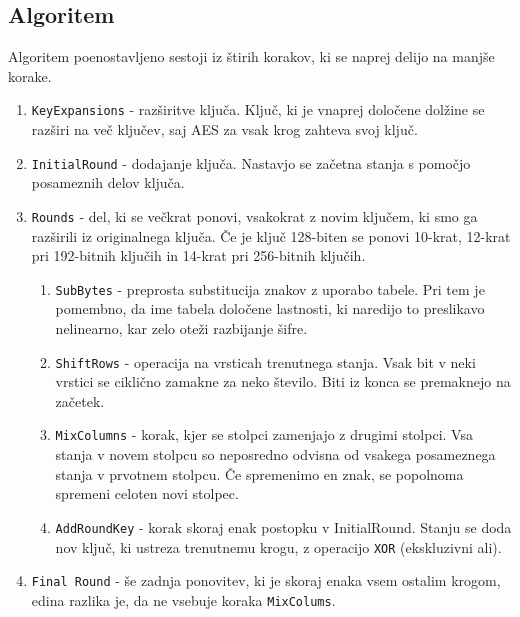 \subsection{Algoritem}
    Algoritem poenostavljeno sestoji iz štirih korakov, ki se naprej delijo na manjše korake.
    \begin{enumerate}
        \item \texttt{KeyExpansions} - razširitve ključa. Ključ, ki je vnaprej določene dolžine se razširi na več ključev, saj AES za vsak krog zahteva svoj ključ.
        \item \texttt{InitialRound} - dodajanje ključa. Nastavjo se začetna stanja s pomočjo posameznih delov ključa.
        \item \texttt{Rounds} - del, ki se večkrat ponovi, vsakokrat z novim ključem, ki smo ga razširili iz originalnega ključa. Če je ključ 128-biten se ponovi 10-krat, 12-krat pri 192-bitnih ključih in 14-krat pri 256-bitnih ključih.
            \begin{enumerate}
                \item \texttt{SubBytes} - preprosta substitucija znakov z uporabo tabele. Pri tem je pomembno, da ime tabela določene lastnosti, ki naredijo to preslikavo nelinearno, kar zelo oteži razbijanje šifre.
                \item \texttt{ShiftRows} - operacija na vrsticah trenutnega stanja. Vsak bit v neki vrstici se ciklično zamakne za neko število. Biti iz konca se premaknejo na začetek.
                \item \texttt{MixColumns} - korak, kjer se stolpci zamenjajo z drugimi stolpci. Vsa stanja v novem stolpcu so neposredno odvisna od vsakega posameznega stanja v prvotnem stolpcu. Če spremenimo en znak, se popolnoma spremeni celoten novi stolpec.
                \item \texttt{AddRoundKey} - korak skoraj enak postopku v InitialRound. Stanju se doda nov ključ, ki ustreza trenutnemu krogu, z operacijo \texttt{XOR} (ekskluzivni ali).
            \end{enumerate}
        \item \texttt{Final Round} - še zadnja ponovitev, ki je skoraj enaka vsem ostalim krogom, edina razlika je, da ne vsebuje koraka \texttt{MixColums}.\cite{wikipedia-aes}
    \end{enumerate}
